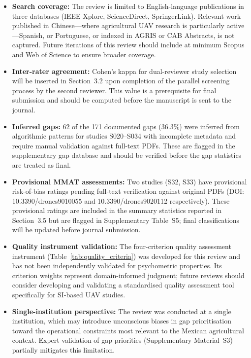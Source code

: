 \documentclass[review,3p,times]{elsarticle}
\begin{document}
\begin{itemize}
  \item \textbf{Search coverage:} The review is limited to English-language publications in three databases (IEEE Xplore, ScienceDirect, SpringerLink). Relevant work published in Chinese---where agricultural UAV research is particularly active---Spanish, or Portuguese, or indexed in AGRIS or CAB Abstracts, is not captured. Future iterations of this review should include at minimum Scopus and Web of Science to ensure broader coverage.
  \item \textbf{Inter-rater agreement:} Cohen's kappa for dual-reviewer study selection will be inserted in Section~3.2 upon completion of the parallel screening process by the second reviewer. This value is a prerequisite for final submission and should be computed before the manuscript is sent to the journal.
  \item \textbf{Inferred gaps:} 62 of the 171 documented gaps (36.3\%) were inferred from algorithmic patterns for studies S020--S034 with incomplete metadata and require manual validation against full-text PDFs. These are flagged in the supplementary gap database and should be verified before the gap statistics are treated as final.
  \item \textbf{Provisional MMAT assessments:} Two studies (S32, S33) have provisional risk-of-bias ratings pending full-text verification against original PDFs (DOI: 10.3390/drones9010055 and 10.3390/drones9020112 respectively). These provisional ratings are included in the summary statistics reported in Section~3.5 but are flagged in Supplementary Table~S5; final classifications will be updated before journal submission.
  \item \textbf{Quality instrument validation:} The four-criterion quality assessment instrument (Table~\ref{tab:quality_criteria}) was developed for this review and has not been independently validated for psychometric properties. Its criterion weights represent domain-informed judgment; future reviews should consider developing and validating a standardised quality assessment tool specifically for SI-based UAV studies.
  \item \textbf{Single-institution perspective:} The review was conducted at a single institution, which may introduce unconscious biases in gap prioritisation toward the operational constraints most relevant to the Mexican agricultural context. Expert validation of gap priorities (Supplementary Material~S3) partially mitigates this limitation.
\end{itemize}
\end{document}
